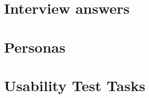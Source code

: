 \chapter{Interview answers}

\chapter{Personas} \label{PersonasAppendix}

\chapter{Usability Test Tasks}
